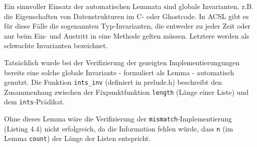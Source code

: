 Ein sinnvoller Einsatz der automatischen Lemmata sind globale Invarianten, z.B. die Eigenschaften von Datenstrukturen
im C- oder Ghostcode. In ACSL gibt es für diese Fälle die sogenannten Typ-Invarianten, die entweder zu jeder Zeit oder
nur beim Ein- und Austritt in eine Methode gelten müssen. Letztere werden als schwachte Invarianten bezeichnet.

Tatsächlich wurde bei der Verifizierung der gezeigten Implementierungungen bereits eine solche
globale Invariante - formuliert als Lemma - automatisch genutzt. Die Funktion \lstinline{ints_inv}
(definiert in prelude.h) beschreibt den Zusammenhang zwischen der Fixpunktfunktion \texttt{length}
(Länge einer Liste) und dem \lstinline{ints}-Prädikat.



Ohne dieses Lemma wäre die Verifizierung der \lstinline{mismatch}-Implementierung (Listing 4.4)
nicht erfolgreich, da die Information fehlen würde, dass \lstinline{n} (im Lemma \lstinline{count})
der Länge der Listen entspricht.

